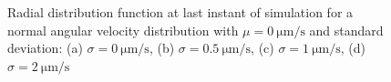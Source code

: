 \documentclass[../../master_thesis_np.tex]{subfiles}
\begin{document}
		\begin{figure}[htp]
			\centering\
			\\
			\\
			
			\caption{Radial distribution function at last instant of simulation for a normal angular velocity distribution with $\mu = \SI{0}{\um\per\second}$ and standard deviation: (a) $\sigma = \SI{0}{\um\per\second}$, (b) $\sigma = \SI{0.5}{\um\per\second}$, (c) $\sigma = \SI{1}{\um\per\second}$, (d) $\sigma = \SI{2}{\um\per\second}$}
			\label{fig:lj_av_rdf}
		\end{figure}
		
\end{document}
